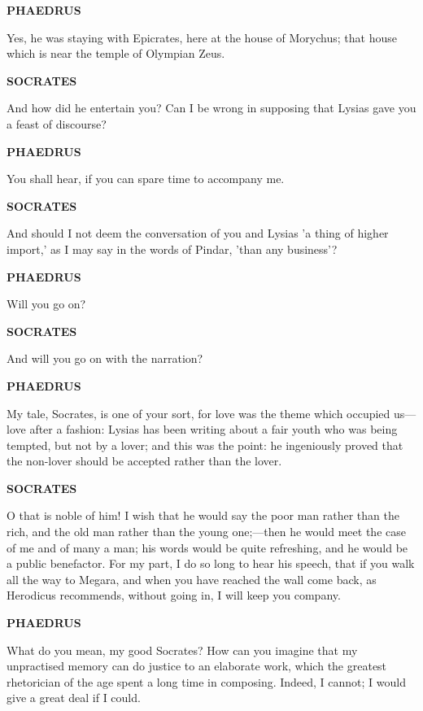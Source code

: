\documentclass[11pt,letter]{article}
\begin{document}
\par \textbf{PHAEDRUS}
\par   Yes, he was staying with Epicrates, here at the house of Morychus; that house which is near the temple of Olympian Zeus.

\par \textbf{SOCRATES}
\par   And how did he entertain you? Can I be wrong in supposing that Lysias gave you a feast of discourse?

\par \textbf{PHAEDRUS}
\par   You shall hear, if you can spare time to accompany me.

\par \textbf{SOCRATES}
\par   And should I not deem the conversation of you and Lysias 'a thing of higher import,' as I may say in the words of Pindar, 'than any business'?

\par \textbf{PHAEDRUS}
\par   Will you go on?

\par \textbf{SOCRATES}
\par   And will you go on with the narration?

\par \textbf{PHAEDRUS}
\par   My tale, Socrates, is one of your sort, for love was the theme which occupied us—love after a fashion:  Lysias has been writing about a fair youth who was being tempted, but not by a lover; and this was the point:  he ingeniously proved that the non-lover should be accepted rather than the lover.

\par \textbf{SOCRATES}
\par   O that is noble of him! I wish that he would say the poor man rather than the rich, and the old man rather than the young one;—then he would meet the case of me and of many a man; his words would be quite refreshing, and he would be a public benefactor. For my part, I do so long to hear his speech, that if you walk all the way to Megara, and when you have reached the wall come back, as Herodicus recommends, without going in, I will keep you company.

\par \textbf{PHAEDRUS}
\par   What do you mean, my good Socrates? How can you imagine that my unpractised memory can do justice to an elaborate work, which the greatest rhetorician of the age spent a long time in composing. Indeed, I cannot; I would give a great deal if I could.
\end{document}
